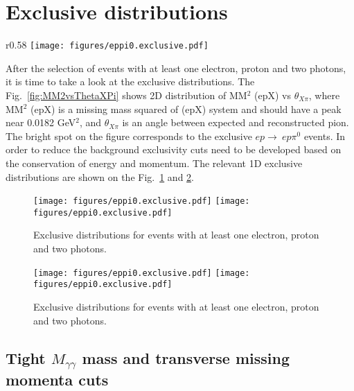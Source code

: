 \section{Exclusive distributions}


\begin{wrapfigure}{r}{0.58\textwidth}
	\vspace*{-0.3cm}
	\texttt{[image: figures/eppi0.exclusive.pdf]}
	\caption{MM$^2$ (epX) vs $\theta_X\pi$ 2D distribution.}
	\label{fig:MM2vsThetaXPi}
\end{wrapfigure}
After the selection of events with at least one electron, proton and two photons, it is time to take a look at the exclusive distributions.
The Fig.~\ref{fig:MM2vsThetaXPi} shows 2D distribution of MM$^2$ (epX) vs $\theta_{X\pi}$, where MM$^2$ (epX) is a missing mass squared of (epX) system and should have a peak near 0.0182 GeV$^2$, and $\theta_{X\pi}$ is an angle between expected and reconstructed pion.
The bright spot on the figure corresponds to the exclusive $ep\rightarrow~ep\pi^0$ events.
In order to reduce the background exclusivity cuts  need to be developed based on the conservation of energy and momentum.
The relevant 1D exclusive distributions are shown on the Fig.~\ref{fig:rawexclusive1} and \ref{fig:rawexclusive2}.

\begin{figure}[hbt]
	\centering
	\texttt{[image: figures/eppi0.exclusive.pdf]}
	\texttt{[image: figures/eppi0.exclusive.pdf]}

	\caption{Exclusive distributions for events with at least one electron, proton and two photons.}
	\label{fig:rawexclusive1}
\end{figure}

\begin{figure}[hbt]
	\centering
	\texttt{[image: figures/eppi0.exclusive.pdf]}
	\texttt{[image: figures/eppi0.exclusive.pdf]}
	
	\caption{Exclusive distributions for events with at least one electron, proton and two photons.}
	\label{fig:rawexclusive2}
\end{figure}

\subsection{Tight $M_{\gamma\gamma}$ mass and transverse missing momenta cuts}

